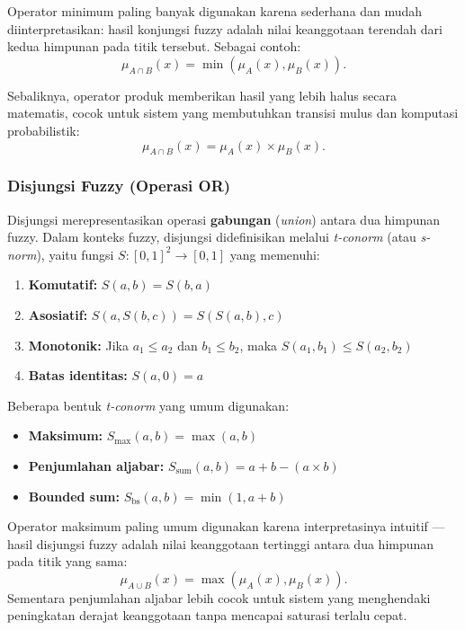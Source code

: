 \documentclass[12pt,a4paper]{article}
\theoremstyle{remark}
\begin{document}
Operator minimum paling banyak digunakan karena sederhana dan mudah diinterpretasikan: hasil konjungsi fuzzy adalah nilai keanggotaan terendah dari kedua himpunan pada titik tersebut.
Sebagai contoh:
\[
    \mu_{A \cap B}(x) = \min(\mu_A(x), \mu_B(x)).
\]

Sebaliknya, operator produk memberikan hasil yang lebih halus secara matematis, cocok untuk sistem yang membutuhkan transisi mulus dan komputasi probabilistik:
\[
    \mu_{A \cap B}(x) = \mu_A(x) \times \mu_B(x).
\]

\subsubsection{Disjungsi Fuzzy (Operasi OR)}
Disjungsi merepresentasikan operasi \textbf{gabungan} (\textit{union}) antara dua himpunan fuzzy. Dalam konteks fuzzy, disjungsi didefinisikan melalui \textit{t-conorm} (atau \textit{s-norm}), yaitu fungsi \(S: [0,1]^2 \to [0,1]\) yang memenuhi:
\begin{enumerate}
    \item \textbf{Komutatif:} \(S(a,b) = S(b,a)\)
    \item \textbf{Asosiatif:} \(S(a, S(b,c)) = S(S(a,b), c)\)
    \item \textbf{Monotonik:} Jika \(a_1 \leq a_2\) dan \(b_1 \leq b_2\), maka \(S(a_1,b_1) \leq S(a_2,b_2)\)
    \item \textbf{Batas identitas:} \(S(a,0) = a\)
\end{enumerate}

Beberapa bentuk \textit{t-conorm} yang umum digunakan:
\begin{itemize}
    \item \textbf{Maksimum:} \(S_{\max}(a,b) = \max(a,b)\)
    \item \textbf{Penjumlahan aljabar:} \(S_{\text{sum}}(a,b) = a + b - (a \times b)\)
    \item \textbf{Bounded sum:} \(S_{\text{bs}}(a,b) = \min(1, a + b)\)
\end{itemize}

Operator maksimum paling umum digunakan karena interpretasinya intuitif — hasil disjungsi fuzzy adalah nilai keanggotaan tertinggi antara dua himpunan pada titik yang sama:
\[
    \mu_{A \cup B}(x) = \max(\mu_A(x), \mu_B(x)).
\]
Sementara penjumlahan aljabar lebih cocok untuk sistem yang menghendaki peningkatan derajat keanggotaan tanpa mencapai saturasi terlalu cepat.
\end{document}
